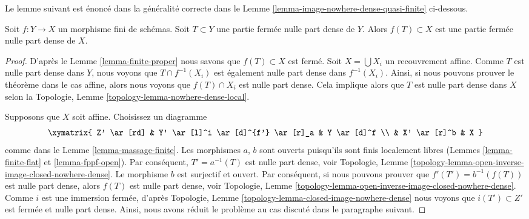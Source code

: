 \noindent
Le lemme suivant est énoncé dans la généralité
correcte dans le Lemme \ref{lemma-image-nowhere-dense-quasi-finite} ci-dessous.

\begin{lemma}
\label{lemma-image-nowhere-dense-finite}
Soit $f : Y \to X$ un morphisme fini de schémas. Soit $T \subset Y$
une partie fermée nulle part dense de $Y$. Alors $f(T) \subset X$
est une partie fermée nulle part dense de $X$.
\end{lemma}

\begin{proof}
D'après le Lemme \ref{lemma-finite-proper} nous savons que $f(T) \subset X$ est fermé. Soit $X = \bigcup X_i$
un recouvrement affine. Comme $T$ est
nulle part dense dans $Y$, nous voyons que $T \cap f^{-1}(X_i)$ est également
nulle part dense dans $f^{-1}(X_i)$. Ainsi, si nous pouvons prouver le théorème dans
le cas affine, alors nous voyons que $f(T) \cap X_i$ est nulle part dense.
Cela implique alors que $T$ est nulle part
dense dans $X$ selon la Topologie, Lemme \ref{topology-lemma-nowhere-dense-local}.

\medskip\noindent Supposons
que $X$ soit affine. Choisissez un diagramme
$$
\xymatrix{
Z' \ar[rd] &
Y' \ar[l]^i \ar[d]^{f'} \ar[r]_a &
Y \ar[d]^f \\
 & X' \ar[r]^b & X
}
$$
comme dans le Lemme \ref{lemma-massage-finite}. Les morphismes $a$,
$b$ sont ouverts puisqu'ils
sont finis localement libres (Lemmes \ref{lemma-finite-flat} et \ref{lemma-fppf-open}).
Par conséquent, $T' = a^{-1}(T)$
est nulle part dense, voir Topologie, Lemme \ref{topology-lemma-open-inverse-image-closed-nowhere-dense}. Le morphisme
$b$ est surjectif et ouvert.
Par conséquent, si nous pouvons prouver que
$f'(T') = b^{-1}(f(T))$ est nulle part dense, alors $f(T)$
est nulle part dense, voir Topologie, Lemme \ref{topology-lemma-open-inverse-image-closed-nowhere-dense}. Comme
$i$ est une immersion
fermée, d'après Topologie, Lemme \ref{topology-lemma-closed-image-nowhere-dense} nous voyons
que $i(T') \subset Z'$ est fermée et nulle part dense.
Ainsi, nous avons réduit le problème au cas discuté dans
le paragraphe suivant.


\end{proof}
